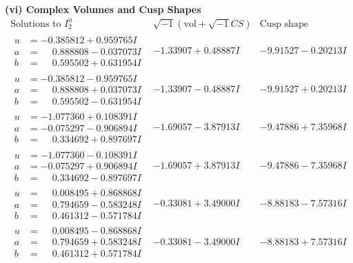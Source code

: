 \documentclass[1p]{elsarticle_modified}
\theoremstyle{definition}
\newcommand{\I}{\sqrt{-1}}
\begin{document}
\newpage\flushleft \textbf{(vi) Complex Volumes and Cusp Shapes}
$$\begin{array}{c|c|c}  
\text{Solutions to }I^u_{2}& \I (\text{vol} + \sqrt{-1}CS) & \text{Cusp shape}\\
 \hline 
\begin{aligned}
u &= -0.385812 + 0.959765 I \\
a &= \phantom{-}0.888808 - 0.037073 I \\
b &= \phantom{-}0.595502 + 0.631954 I\end{aligned}
 & -1.33907 + 0.48887 I & -9.91527 - 0.20213 I \\ \hline\begin{aligned}
u &= -0.385812 - 0.959765 I \\
a &= \phantom{-}0.888808 + 0.037073 I \\
b &= \phantom{-}0.595502 - 0.631954 I\end{aligned}
 & -1.33907 - 0.48887 I & -9.91527 + 0.20213 I \\ \hline\begin{aligned}
u &= -1.077360 + 0.108391 I \\
a &= -0.075297 - 0.906894 I \\
b &= \phantom{-}0.334692 + 0.897697 I\end{aligned}
 & -1.69057 - 3.87913 I & -9.47886 + 7.35968 I \\ \hline\begin{aligned}
u &= -1.077360 - 0.108391 I \\
a &= -0.075297 + 0.906894 I \\
b &= \phantom{-}0.334692 - 0.897697 I\end{aligned}
 & -1.69057 + 3.87913 I & -9.47886 - 7.35968 I \\ \hline\begin{aligned}
u &= \phantom{-}0.008495 + 0.868868 I \\
a &= \phantom{-}0.794659 - 0.583248 I \\
b &= \phantom{-}0.461312 - 0.571784 I\end{aligned}
 & -0.33081 + 3.49000 I & -8.88183 - 7.57316 I \\ \hline\begin{aligned}
u &= \phantom{-}0.008495 - 0.868868 I \\
a &= \phantom{-}0.794659 + 0.583248 I \\
b &= \phantom{-}0.461312 + 0.571784 I\end{aligned}
 & -0.33081 - 3.49000 I & -8.88183 + 7.57316 I \\ \hline\begin{aligned}

\end{aligned}
\end{array}$$
\end{document}
